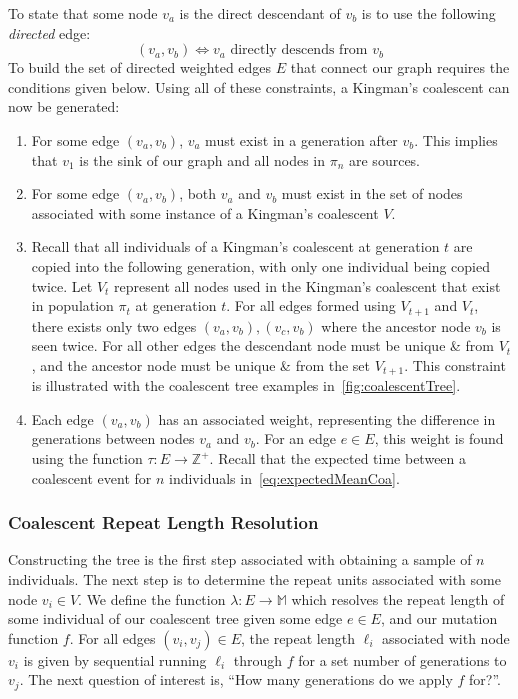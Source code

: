 To state that some node $v_a$ is the direct descendant of $v_b$ is to use the following \emph{directed} edge:
\begin{equation}
    (v_a, v_b) \Leftrightarrow v_a \text{ directly descends from } v_b
\end{equation}
To build the set of directed weighted edges $E$ that connect our graph requires the conditions given below.
Using all of these constraints, a Kingman's coalescent can now be generated:
\begin{enumerate}
    \item For some edge $(v_a, v_b)$, $v_a$ must exist in a generation after $v_b$.
        This implies that $v_1$ is the sink of our graph and all nodes in $\pi_n$ are sources.
    \item For some edge $(v_a, v_b)$, both $v_a$ and $v_b$ must exist in the set of nodes associated with some instance
        of a Kingman's coalescent $V$.
    \item Recall that all individuals of a Kingman's coalescent at generation $t$ are copied into the following
        generation, with only one individual being copied twice.
        Let $V_t$ represent all nodes used in the Kingman's coalescent that exist in population $\pi_t$ at generation
        $t$.
        For all edges formed using $V_{t+1}$ and $V_{t}$, there exists only two edges $(v_a, v_b), (v_c, v_b)$ where
        the ancestor node $v_b$ is seen twice.
        For all other edges the descendant node must be unique \& from $V_t$, and the ancestor node must be unique \&
        from the set $V_{t+1}$.
        This constraint is illustrated with the coalescent tree examples in~\autoref{fig:coalescentTree}.
    \item Each edge $(v_a, v_b)$ has an associated weight, representing the difference in generations between nodes
        $v_a$ and $v_b$.
        For an edge $e \in E$, this weight is found using the function $\tau : E \rightarrow \mathbb{Z}^+$.
        Recall that the expected time between a coalescent event for $n$ individuals in~\autoref{eq:expectedMeanCoa}.

\end{enumerate}

\subsubsection{Coalescent Repeat Length Resolution}
Constructing the tree is the first step associated with obtaining a sample of $n$ individuals.
The next step is to determine the repeat units associated with some node $v_i \in V$.
We define the function $\lambda : E \rightarrow \mathbb{M}$ which resolves the repeat length of some
individual of our coalescent tree given some edge $e \in E$, and our mutation function $f$.
For all edges $(v_i, v_j) \in E$, the repeat length $\ell_i$ associated with node $v_i$ is given by sequential running
$\ell_i$ through $f$ for a set number of generations to $v_j$.
The next question of interest is, ``How many generations do we apply $f$ for?''.

